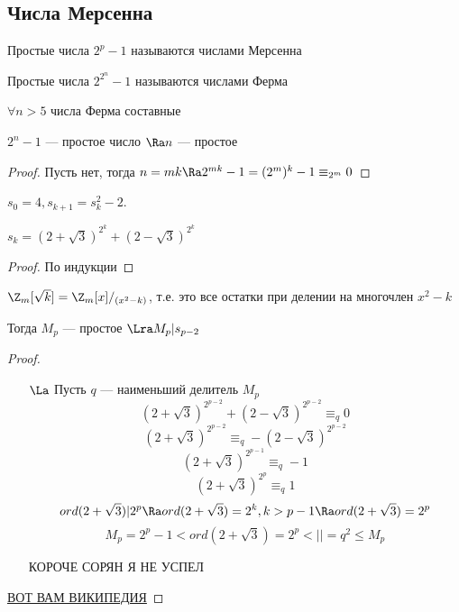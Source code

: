 \subsection{Числа Мерсенна}
\begin{definition}
    Простые числа \(2^p - 1\) называются числами Мерсенна
\end{definition}

\begin{definition}
    Простые числа \(2^{2^n} - 1\) называются числами Ферма
\end{definition}

\begin{note}
    \(\forall n > 5\) числа Ферма составные
\end{note}

\begin{note}
    \(2^n - 1\) --- простое число \(\Ra n\) --- простое
\end{note}
\begin{proof}
    Пусть нет, тогда \(n = mk \Ra 2^{mk} - 1 = (2^m)^k - 1 \equiv_{2^m} 0\)
\end{proof}

\begin{definition}
    \(s_0 = 4, s_{k + 1} = s_k^2 - 2\).
\end{definition}

\begin{lemma}
    \(s_k = (2 + \sqrt{3})^{2^k} + (2 - \sqrt{3})^{2^k}\)
\end{lemma}
\begin{proof}
    По индукции
\end{proof}

\begin{definition}
    \(\Z_m[\sqrt{k}] = \Z_m[x]/_{(x^2 - k)}\), т.е. это все остатки при делении на многочлен \(x^2 - k\)
\end{definition}

\begin{theorem}
    Тогда \(M_p\) --- простое \(\Lra M_p | s_{p - 2}\)
\end{theorem}
\begin{proof}\indent
    \begin{enumerate}
        \item[\(\La\)] Пусть \(q\) --- наименьший делитель \(M_p\)
        \[(2 + \sqrt{3})^{2^{p - 2}} + (2 - \sqrt{3})^{2^{p - 2}} \equiv_q 0\]
        \[(2 + \sqrt{3})^{2^{p - 2}} \equiv_q - (2 - \sqrt{3})^{2^{p - 2}}\]
        \[(2 + \sqrt{3})^{2^{p - 1}} \equiv_q -1\]
        \[(2 + \sqrt{3})^{2^p} \equiv_q 1\]
        \[ord(2 + \sqrt{3}) | {2^p} \Ra ord(2 + \sqrt{3}) = 2^k, k > p - 1 \Ra ord(2 + \sqrt{3}) = 2^p\]
        \[M_p = 2^p - 1 < ord(2 + \sqrt{3}) = 2^p < || =  q^2 \le M_p\]

        КОРОЧЕ СОРЯН Я НЕ УСПЕЛ
    \end{enumerate}    
    \href{https://ru.wikipedia.org/wiki/Тест_Люка_—_Лемера#Достаточность}{ВОТ ВАМ ВИКИПЕДИЯ}
\end{proof}